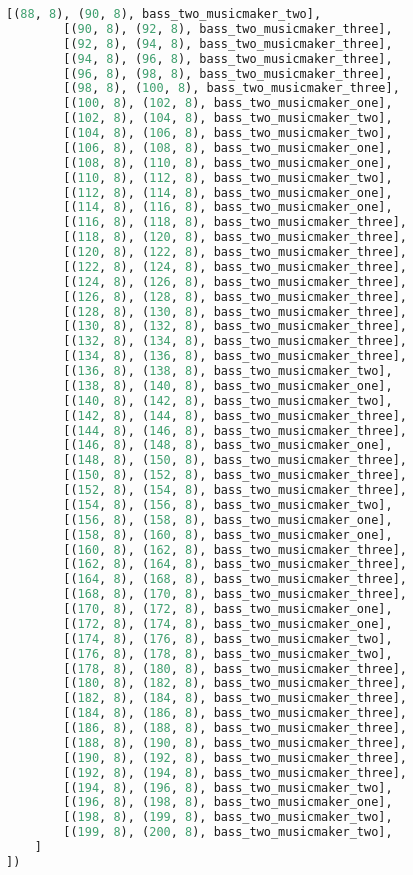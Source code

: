 \begin{lstlisting}[language=Python, caption=Invocation Source Code]
        [(88, 8), (90, 8), bass_two_musicmaker_two],
        [(90, 8), (92, 8), bass_two_musicmaker_three],
        [(92, 8), (94, 8), bass_two_musicmaker_three],
        [(94, 8), (96, 8), bass_two_musicmaker_three],
        [(96, 8), (98, 8), bass_two_musicmaker_three],
        [(98, 8), (100, 8), bass_two_musicmaker_three],
        [(100, 8), (102, 8), bass_two_musicmaker_one],
        [(102, 8), (104, 8), bass_two_musicmaker_two],
        [(104, 8), (106, 8), bass_two_musicmaker_two],
        [(106, 8), (108, 8), bass_two_musicmaker_one],
        [(108, 8), (110, 8), bass_two_musicmaker_one],
        [(110, 8), (112, 8), bass_two_musicmaker_two],
        [(112, 8), (114, 8), bass_two_musicmaker_one],
        [(114, 8), (116, 8), bass_two_musicmaker_one],
        [(116, 8), (118, 8), bass_two_musicmaker_three],
        [(118, 8), (120, 8), bass_two_musicmaker_three],
        [(120, 8), (122, 8), bass_two_musicmaker_three],
        [(122, 8), (124, 8), bass_two_musicmaker_three],
        [(124, 8), (126, 8), bass_two_musicmaker_three],
        [(126, 8), (128, 8), bass_two_musicmaker_three],
        [(128, 8), (130, 8), bass_two_musicmaker_three],
        [(130, 8), (132, 8), bass_two_musicmaker_three],
        [(132, 8), (134, 8), bass_two_musicmaker_three],
        [(134, 8), (136, 8), bass_two_musicmaker_three],
        [(136, 8), (138, 8), bass_two_musicmaker_two],
        [(138, 8), (140, 8), bass_two_musicmaker_one],
        [(140, 8), (142, 8), bass_two_musicmaker_two],
        [(142, 8), (144, 8), bass_two_musicmaker_three],
        [(144, 8), (146, 8), bass_two_musicmaker_three],
        [(146, 8), (148, 8), bass_two_musicmaker_one],
        [(148, 8), (150, 8), bass_two_musicmaker_three],
        [(150, 8), (152, 8), bass_two_musicmaker_three],
        [(152, 8), (154, 8), bass_two_musicmaker_three],
        [(154, 8), (156, 8), bass_two_musicmaker_two],
        [(156, 8), (158, 8), bass_two_musicmaker_one],
        [(158, 8), (160, 8), bass_two_musicmaker_one],
        [(160, 8), (162, 8), bass_two_musicmaker_three],
        [(162, 8), (164, 8), bass_two_musicmaker_three],
        [(164, 8), (168, 8), bass_two_musicmaker_three],
        [(168, 8), (170, 8), bass_two_musicmaker_three],
        [(170, 8), (172, 8), bass_two_musicmaker_one],
        [(172, 8), (174, 8), bass_two_musicmaker_one],
        [(174, 8), (176, 8), bass_two_musicmaker_two],
        [(176, 8), (178, 8), bass_two_musicmaker_two],
        [(178, 8), (180, 8), bass_two_musicmaker_three],
        [(180, 8), (182, 8), bass_two_musicmaker_three],
        [(182, 8), (184, 8), bass_two_musicmaker_three],
        [(184, 8), (186, 8), bass_two_musicmaker_three],
        [(186, 8), (188, 8), bass_two_musicmaker_three],
        [(188, 8), (190, 8), bass_two_musicmaker_three],
        [(190, 8), (192, 8), bass_two_musicmaker_three],
        [(192, 8), (194, 8), bass_two_musicmaker_three],
        [(194, 8), (196, 8), bass_two_musicmaker_two],
        [(196, 8), (198, 8), bass_two_musicmaker_one],
        [(198, 8), (199, 8), bass_two_musicmaker_two],
        [(199, 8), (200, 8), bass_two_musicmaker_two],
    ]
])


\end{lstlisting}
